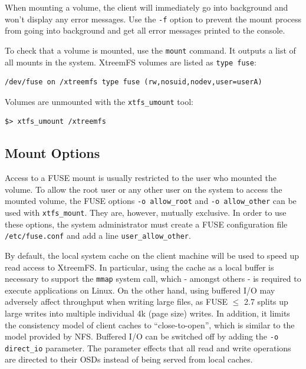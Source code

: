 \documentclass[a4paper,10pt]{book}
\begin{document}
When mounting a volume, the client will immediately go into background and won't display any error messages. Use the \texttt{-f} option to prevent the mount process from going into background and get all error messages printed to the console.

To check that a volume is mounted, use the \texttt{mount} command. It outputs a list of all mounts in the system. XtreemFS volumes are listed as \texttt{type fuse}:

\begin{verbatim}
/dev/fuse on /xtreemfs type fuse (rw,nosuid,nodev,user=userA)
\end{verbatim}

Volumes are unmounted with the \texttt{xtfs\_umount} tool:

\begin{verbatim}
$> xtfs_umount /xtreemfs
\end{verbatim}

\subsection{Mount Options}

Access to a FUSE mount is usually restricted to the user who mounted the volume. To allow the root user or any other user on the system to access the mounted volume, the FUSE options \texttt{-o allow\_root} and \texttt{-o allow\_other} can be used with \texttt{xtfs\_mount}. They are, however, mutually exclusive. In order to use these options, the system administrator must create a FUSE configuration file \texttt{/etc/fuse.conf} and add a line \texttt{user\_allow\_other}.

By default, the local system cache on the client machine will be used to speed up read access to XtreemFS. In particular, using the cache as a local buffer is necessary to support the \texttt{mmap} system call, which - amongst others - is required to execute applications on Linux. On the other hand, using buffered I/O may adversely affect throughput when writing large files, as FUSE $\leq$ 2.7 splits up large writes into multiple individual 4k (page size) writes. In addition, it limits the consistency model of client caches to ``close-to-open'', which is similar to the model provided by NFS. Buffered I/O can be switched off by adding the \texttt{-o direct\_io} parameter. The parameter effects that all read and write operations are directed to their OSDs instead of being served from local caches.
\end{document}
